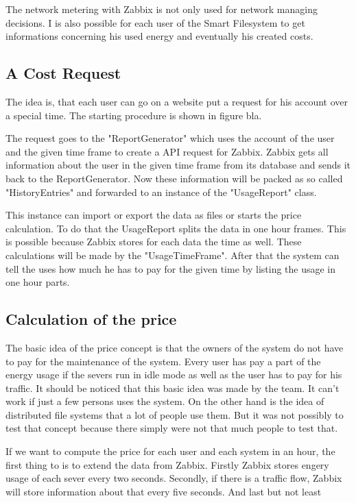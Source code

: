The network metering with Zabbix is not only used for network managing  decisions. I is also possible for each user of the Smart Filesystem to get informations concerning his used energy and eventually his created costs.
\subsection{A Cost Request}
 The idea is, that each user can go on a website put a request for his account over a special time. The starting procedure is shown in figure bla. 


 The request goes to the "ReportGenerator" which uses the account of the user and the given time frame to create a API request for Zabbix. Zabbix gets all information about the user in the given time frame from its database and sends it back to the ReportGenerator. Now these information will be packed as so called "HistoryEntries" and forwarded to an instance of the "UsageReport" class. 
 
 This instance can import or export the data as files or starts the price calculation. To do that the UsageReport splits the data in one hour frames. This is possible because Zabbix stores for each data the time as well. These calculations will be made by the "UsageTimeFrame". After that the system can tell the uses how much he has to pay for the given time by listing the usage in one hour parts.
 
 \subsection{Calculation of the price} 
 The basic idea of the price concept is that the owners of the system do not have to pay for the maintenance of the system. Every user has pay a part of the energy usage if the severs run in idle mode as well as the user has to pay for his traffic. It should be noticed that this basic idea was made by the team. It can't work if just a few persons uses the system. On the other hand is the idea of distributed file systems that a lot of people use them. But it was not possibly to test that concept because there simply were not that much people to test that. 
 
 If we want to compute the price for each user and each system in an hour, the first thing to is to extend the data from Zabbix. Firstly Zabbix stores engery usage of each sever every two seconds. Secondly, if there is a traffic flow, Zabbix will store information about that every five seconds. And last but not least 